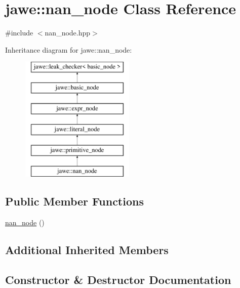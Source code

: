 \hypertarget{classjawe_1_1nan__node}{}\section{jawe\+:\+:nan\+\_\+node Class Reference}
\label{classjawe_1_1nan__node}


{\ttfamily \#include $<$nan\+\_\+node.\+hpp$>$}

Inheritance diagram for jawe\+:\+:nan\+\_\+node\+:\begin{figure}[H]
\begin{center}
\leavevmode
\includegraphics[height=6.000000cm]{classjawe_1_1nan__node}
\end{center}
\end{figure}
\subsection*{Public Member Functions}
\begin{DoxyCompactItemize}
\item 
\hyperlink{classjawe_1_1nan__node_a973a26fdd65cedcc661b3588cb4affdb}{nan\+\_\+node} ()
\end{DoxyCompactItemize}
\subsection*{Additional Inherited Members}


\subsection{Constructor \& Destructor Documentation}
\mbox{\label{classjawe_1_1nan__node_a973a26fdd65cedcc661b3588cb4affdb}} 
